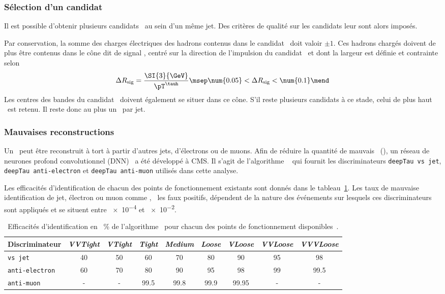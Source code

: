 \subsubsection{Sélection d'un candidat}
Il est possible d'obtenir plusieurs candidats \tauh\ au sein d'un même jet.
Des critères de qualité sur les candidats leur sont alors imposés.
\par
Par conservation, la somme des charges électriques des hadrons contenus dans le candidat \tauh\ doit valoir $\pm1$.
Ces hadrons chargés doivent de plus être contenus dans le cône dit \og de signal \fg{},
centré sur la direction de l'impulsion du candidat \tauh\
et dont la largeur est définie et contrainte selon
\begin{equation}
\Delta R_\text{sig} = \frac{\SI{3}{\GeV}}{\pT^{\tauh}}
\msep
\num{0.05} < \Delta R_\text{sig} < \num{0.1}
\mend
\end{equation}
Les centres des bandes du candidat \tauh\ doivent également se situer dans ce cône.
S'il reste plusieurs candidats à ce stade, celui de plus haut \pT\ est retenu.
Il reste donc au plus un \tauh\ par jet.
\subsubsection{Mauvaises reconstructions}
Un \tauh\ peut être reconstruit à tort à partir d'autres jets, d'électrons ou de muons.
Afin de réduire la quantité de mauvais \tauh\ (\ftauh), un réseau de neurones profond convolutionnel (DNN)~\cite{DNN} a été développé à CMS.
Il s'agit de l'algorithme \DEEPTAU~\cite{CMS-DP-2019-033} qui fournit les discriminateurs
\texttt{deepTau vs jet},
\texttt{deepTau anti-electron} et
\texttt{deepTau anti-muon}
utilisés dans cette analyse.
\par
Les efficacités d'identification de chacun des points de fonctionnement existants sont donnés dans le tableau~\ref{tab-JERC-section-taus-DEEPTAU_eff}.
Les taux de mauvaise identification de jet, électron ou muon comme \tauh, \ie\ les faux positifs, dépendent de la nature des événements sur lesquels ces discriminateurs sont appliqués et se situent entre \num{e-4} et \num{e-2}.
\begin{table}[h]
\centering
\begin{tabular}{lcccccccc}
\toprule
Discriminateur & \emph{VVTight} & \emph{VTight} & \emph{Tight} & \emph{Medium} & \emph{Loose} & \emph{VLoose} & \emph{VVLoose} & \emph{VVVLoose}\\
\midrule
\texttt{vs jet} & \num{40} & \num{50} & \num{60} & \num{70} & \num{80} & \num{90} & \num{95} & \num{98} \\
\texttt{anti-electron} & \num{60} & \num{70} & \num{80} & \num{90} & \num{95} & \num{98} & \num{99} & \num{99.5} \\
\texttt{anti-muon} & - & - & \num{99.5} & \num{99.8} & \num{99.9} & \num{99.95} & - & - \\
\bottomrule
\end{tabular}
\caption[Efficacités d'identification de l'algorithme \DEEPTAU.]{Efficacités d'identification en \SI{}{\%} de l'algorithme \DEEPTAU\ pour chacun des points de fonctionnement disponibles~\cite{CMS-DP-2019-033,Androsov_deeptau}.}
\label{tab-JERC-section-taus-DEEPTAU_eff}
\end{table}